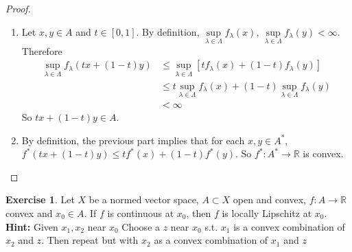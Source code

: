 \documentclass[12pt]{amsart}
\theoremstyle{definition}
\newtheorem{ex}[definition]{Exercise}
\newcommand{\lam}{\lambda}
\newcommand{\Lam}{\Lambda}
\newcommand{\R}{\mathbb{R}}
\newcommand{\lex}[1]{\label{ex:#1}}
\begin{document}
	\begin{proof}
		\begin{enumerate}
			\item Let $x, y \in A$ and $t \in [0,1]$. By definition, $ \sup\limits_{\lam \in \Lam} f_{\lam}(x)$,  $\sup\limits_{\lam \in \Lam} f_{\lam}(y) < \infty$. Therefore 
			\begin{align*}
				 \sup\limits_{\lam \in \Lam} f_{\lam}(tx + (1-t)y) 
				&\leq \sup\limits_{\lam \in \Lam} [tf_{\lam}(x) + (1-t)f_{\lam}(y) ]  \\
				& \leq t \sup\limits_{\lam \in \Lam} f_{\lam}(x) + (1-t) \sup\limits_{\lam \in \Lam} f_{\lam}(y) \\
				& < \infty
			\end{align*}
			So $tx + (1-t)y \in A$.
			\item  By definition, the previous part implies that for each $x,y \in A^*$, $f^*(tx + (1-t)y) \leq t f^*(x) + (1-t)f^*(y)$. So $f^*:A^* \rightarrow \R$ is convex.
		\end{enumerate}
	\end{proof}
	
	
	
	
	\begin{ex} \lex{91016}
	Let $X$ be a normed vector space, $A \subset X$ open and convex, $f:A \rightarrow \R$ convex and $x_0 \in A$. If $f$ is continuous at $x_0$, then $f$ is locally Lipschitz at $x_0$. \\
	\textbf{Hint:} Given $x_1, x_2$ near $x_0$ Choose a $z$ near $x_0$ s.t. $x_1$ is a convex combination of $x_2$ and $z$. Then repeat but with $x_2$ as a convex combination of $x_1$ and $z$
	\end{ex}
	
\end{document}
